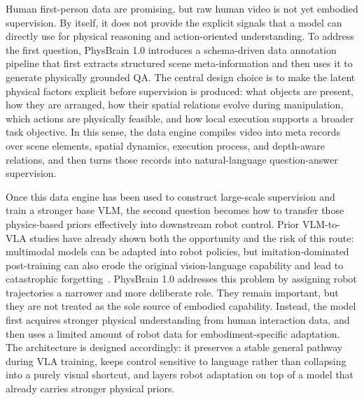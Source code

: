 \documentclass{llmxive}
\begin{document}
Human first-person data are promising, but raw human video is not yet embodied supervision. By itself, it does not provide the explicit signals that a model can directly use for physical reasoning and action-oriented understanding. To address the first question, PhysBrain 1.0 introduces a schema-driven data annotation pipeline that first extracts structured scene meta-information and then uses it to generate physically grounded QA. The central design choice is to make the latent physical factors explicit before supervision is produced: what objects are present, how they are arranged, how their spatial relations evolve during manipulation, which actions are physically feasible, and how local execution supports a broader task objective. In this sense, the data engine compiles video into meta records over scene elements, spatial dynamics, execution process, and depth-aware relations, and then turns those records into natural-language question-answer supervision.

Once this data engine has been used to construct large-scale supervision and train a stronger base VLM, the second question becomes how to transfer those physics-based priors effectively into downstream robot control. Prior VLM-to-VLA studies have already shown both the opportunity and the risk of this route: multimodal models can be adapted into robot policies, but imitation-dominated post-training can also erode the original vision-language capability and lead to catastrophic forgetting~\cite{ChatVLA2_2025_arXiv,VLM2VLA_2025_arXiv,TwinBrainVLA_2026_arXiv}. PhysBrain 1.0 addresses this problem by assigning robot trajectories a narrower and more deliberate role. They remain important, but they are not treated as the sole source of embodied capability. Instead, the model first acquires stronger physical understanding from human interaction data, and then uses a limited amount of robot data for embodiment-specific adaptation. The architecture is designed accordingly: it preserves a stable general pathway during VLA training, keeps control sensitive to language rather than collapsing into a purely visual shortcut, and layers robot adaptation on top of a model that already carries stronger physical priors.
\end{document}

